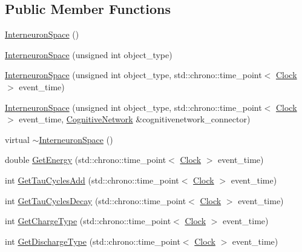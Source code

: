\subsection*{Public Member Functions}
\begin{DoxyCompactItemize}
\item 
\hyperlink{class_interneuron_space_a4ad439037f087e7d5cb3e1d8c581ee5f}{Interneuron\+Space} ()
\item 
\hyperlink{class_interneuron_space_a18d5d4920073a9a93ee3cb8f5efe9211}{Interneuron\+Space} (unsigned int object\+\_\+type)
\item 
\hyperlink{class_interneuron_space_a753903f3c74415922607846040ac50a6}{Interneuron\+Space} (unsigned int object\+\_\+type, std\+::chrono\+::time\+\_\+point$<$ \hyperlink{universe_8h_a0ef8d951d1ca5ab3cfaf7ab4c7a6fd80}{Clock} $>$ event\+\_\+time)
\item 
\hyperlink{class_interneuron_space_aa87eb8c7186542989fccdadc594c5915}{Interneuron\+Space} (unsigned int object\+\_\+type, std\+::chrono\+::time\+\_\+point$<$ \hyperlink{universe_8h_a0ef8d951d1ca5ab3cfaf7ab4c7a6fd80}{Clock} $>$ event\+\_\+time, \hyperlink{class_cognitive_network}{Cognitive\+Network} \&cognitivenetwork\+\_\+connector)
\item 
virtual \hyperlink{class_interneuron_space_aff0056e3c60b7eff3ad4ca12f6756628}{$\sim$\+Interneuron\+Space} ()
\item 
double \hyperlink{class_interneuron_space_a677430712211956219767d4fa71d20e6}{Get\+Energy} (std\+::chrono\+::time\+\_\+point$<$ \hyperlink{universe_8h_a0ef8d951d1ca5ab3cfaf7ab4c7a6fd80}{Clock} $>$ event\+\_\+time)
\item 
int \hyperlink{class_interneuron_space_abd37d409a97acca62d11576314bdfcf4}{Get\+Tau\+Cycles\+Add} (std\+::chrono\+::time\+\_\+point$<$ \hyperlink{universe_8h_a0ef8d951d1ca5ab3cfaf7ab4c7a6fd80}{Clock} $>$ event\+\_\+time)
\item 
int \hyperlink{class_interneuron_space_a1024eadca0b56be9b54593ea47c5879f}{Get\+Tau\+Cycles\+Decay} (std\+::chrono\+::time\+\_\+point$<$ \hyperlink{universe_8h_a0ef8d951d1ca5ab3cfaf7ab4c7a6fd80}{Clock} $>$ event\+\_\+time)
\item 
int \hyperlink{class_interneuron_space_a90a2c950dd426ed3f015e3c186e877fd}{Get\+Charge\+Type} (std\+::chrono\+::time\+\_\+point$<$ \hyperlink{universe_8h_a0ef8d951d1ca5ab3cfaf7ab4c7a6fd80}{Clock} $>$ event\+\_\+time)
\item 
int \hyperlink{class_interneuron_space_ae65bf091b84fa11459ef754ed1c7bf21}{Get\+Discharge\+Type} (std\+::chrono\+::time\+\_\+point$<$ \hyperlink{universe_8h_a0ef8d951d1ca5ab3cfaf7ab4c7a6fd80}{Clock} $>$ event\+\_\+time)

\end{DoxyCompactItemize}

